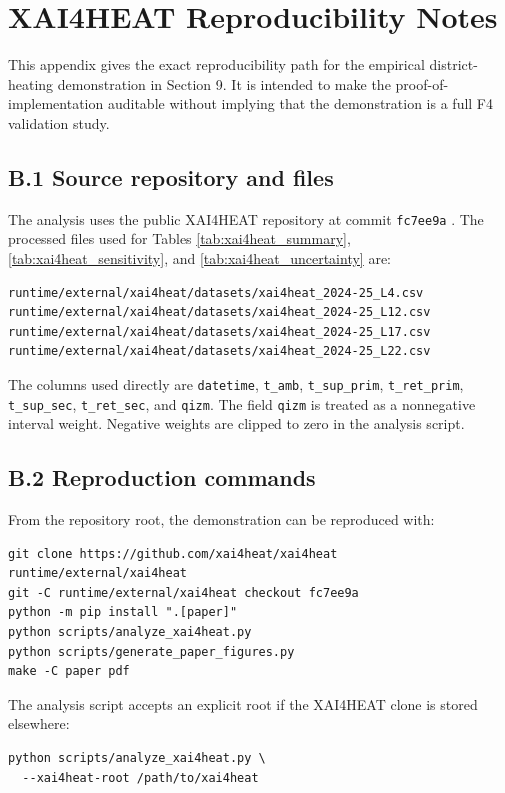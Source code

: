 \documentclass[11pt]{article}
\begin{document}
\section{XAI4HEAT Reproducibility Notes}

This appendix gives the exact reproducibility path for the empirical district-heating demonstration in Section 9. It is intended to make the proof-of-implementation auditable without implying that the demonstration is a full F4 validation study.

\subsection*{B.1 Source repository and files}

The analysis uses the public XAI4HEAT repository at commit \texttt{fc7ee9a} \cite{xai4heatgithub}. The processed files used for Tables \ref{tab:xai4heat_summary}, \ref{tab:xai4heat_sensitivity}, and \ref{tab:xai4heat_uncertainty} are:
\begin{verbatim}
runtime/external/xai4heat/datasets/xai4heat_2024-25_L4.csv
runtime/external/xai4heat/datasets/xai4heat_2024-25_L12.csv
runtime/external/xai4heat/datasets/xai4heat_2024-25_L17.csv
runtime/external/xai4heat/datasets/xai4heat_2024-25_L22.csv
\end{verbatim}

The columns used directly are \texttt{datetime}, \texttt{t\_amb}, \texttt{t\_sup\_prim}, \texttt{t\_ret\_prim}, \texttt{t\_sup\_sec}, \texttt{t\_ret\_sec}, and \texttt{qizm}. The field \texttt{qizm} is treated as a nonnegative interval weight. Negative weights are clipped to zero in the analysis script.

\subsection*{B.2 Reproduction commands}

From the repository root, the demonstration can be reproduced with:
\begin{verbatim}
git clone https://github.com/xai4heat/xai4heat runtime/external/xai4heat
git -C runtime/external/xai4heat checkout fc7ee9a
python -m pip install ".[paper]"
python scripts/analyze_xai4heat.py
python scripts/generate_paper_figures.py
make -C paper pdf
\end{verbatim}

The analysis script accepts an explicit root if the XAI4HEAT clone is stored elsewhere:
\begin{verbatim}
python scripts/analyze_xai4heat.py \
  --xai4heat-root /path/to/xai4heat
\end{verbatim}
\end{document}
